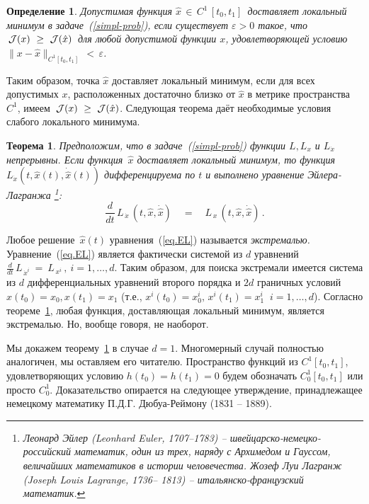\documentclass[12pt,a4paper]{article}
\newtheorem{theorem}{Теорема}
\newtheorem{defi}{Определение}
\newcommand{\cJ}{{\cal{J}}}
\begin{document}
\begin{defi}\label{d.feasible-simpl}
Допустимая функция $\hat x \, \in \, C^1\,  [t_0, t_1]\,$ доставляет локальный минимум в
задаче~(\ref{simpl-prob}), если существует $\varepsilon
> 0$ такое, что $\, \cJ (x)\ \ge \ \cJ(\hat x)\, $ для любой
допустимой функции $x$, удовлетворяющей условию $\bigl\| x- \hat x
\bigr\|_{C^1[t_0, t_1]}\,  < \, \varepsilon$.
\end{defi}
Таким образом, точка $\hat x$ доставляет локальный минимум,
если для всех допустимых $x$, расположенных достаточно близко от
$\hat x$ в метрике пространства $C^1$, имеем $\, \cJ (x)\ \ge \
\cJ(\hat x)$. Следующая теорема даёт необходимые условия слабого
локального минимума.
\begin{theorem}\label{th.EL}
Предположим, что в задаче~(\ref{simpl-prob}) функции $L, L_x$ и
$L_{\dot x}$ непрерывны.  Если функция~$\hat x$ доставляет
локальный минимум, то функция $L_{\dot x}(t, \hat x (t), \dot {\hat x}(t))$ дифференцируема по $t$ и выполнено уравнение Эйлера-Лагранжа \footnote{Леонард Эйлер (Leonhard Euler, 1707--1783)  -- швейцарско-немецко-российский математик,
один из трех, наряду с Архимедом и Гауссом, величайших математиков в истории человечества.
Жозеф Луи Лагранж  (Joseph Louis Lagrange, 1736-- 1813) -- итальянско-французский математик.}:
\begin{equation}\label{eq.EL}
\frac{d}{dt}\, L_{\, \dot x}\, (t, \hat x , \dot {\hat x})\quad =
\quad  L_{\, x}\, (t, \hat x , \dot {\hat x})\, .
\end{equation}
\end{theorem}
Любое решение~$\hat x (t)$ уравнения~(\ref{eq.EL}) называется {\em
экстремалью.} Уравнение~(\ref{eq.EL}) является фактически системой
из $d$ уравнений $\frac{d}{dt}\, L_{\, \dot x^i}\ = \  L_{\,
x^i}\, , \ i = 1, \ldots , d$. Таким образом, для поиска
экстремали имеется система из $d$ дифференциальных уравнений
второго порядка и $2d$ граничных условий $x(t_0)=x_0, x(t_1)=x_1$
(т.е., $x^i(t_0)=x_{0}^i, \, x^i(t_1)=x_{1}^i\, \, \ i = 1, \ldots,
d$). Согласно теореме~\ref{th.EL},   любая функция, доставляющая
 локальный минимум, является экстремалью. Но, вообще говоря,
не наоборот.

Мы докажем теорему~\ref{th.EL} в случае $d=1$.
Многомерный случай полностью аналогичен, мы оставляем его
читателю. Пространство
функций из $C^1[t_0, t_1]$, удовлетворяющих условию $h(t_0) =
h(t_1)=0$ будем обозначать $C_0^1[t_0, t_1]$ или просто $C_0^1$.
Доказательство опирается на следующее утверждение, принадлежащее
немецкому математику П.Д.Г. Дюбуа-Реймону (1831 -- 1889).
\end{document}
